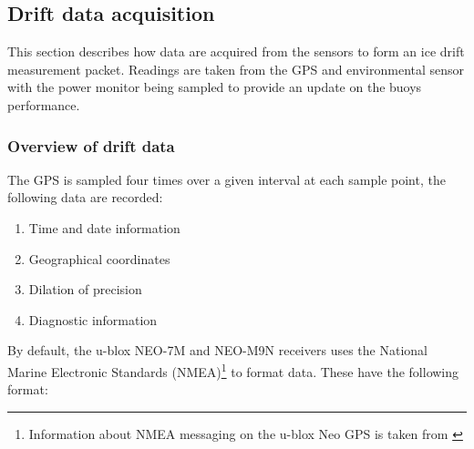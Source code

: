 \subsection{Drift data acquisition}

This section describes how data are acquired from the sensors to form an ice drift measurement packet. Readings are taken from the GPS and environmental sensor with the power monitor being sampled to provide an update on the buoys performance.\par 

\subsubsection{Overview of drift data}

The GPS is sampled four times over a given interval at each sample point, the following data are recorded:


\begin{enumerate}
	\item Time and date information
	\item Geographical coordinates
	\item Dilation of precision
	\item Diagnostic information
\end{enumerate}

By default, the u-blox NEO-7M and NEO-M9N receivers uses the National Marine Electronic Standards (NMEA)\footnote{Information about NMEA messaging on the u-blox Neo GPS is taken from \cite{UBLOX_M9N_INTERFACE}} to format data. These have the following format:

